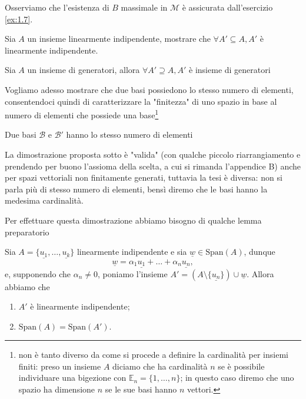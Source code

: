 \begin{remark}
    Osserviamo che l'esistenza di $B$ massimale in $\mathcal{M}$ è assicurata dall'esercizio \ref{ex:1.7}.
\end{remark}
\begin{exercise}
    \label{ex:1.5} Sia $A$ un insieme linearmente indipendente, mostrare che $\forall A' \subseteq A, A'$ è linearmente indipendente.
\end{exercise}
\begin{exercise}
    \label{ex:1.6} Sia $A$ un insieme di generatori, allora $\forall A' \supseteq A, A'$ è insieme di generatori
\end{exercise}
Vogliamo adesso mostrare che due basi possiedono lo stesso numero di elementi, consentendoci quindi di caratterizzare la "finitezza" di uno spazio in base al numero di elementi che possiede una base\footnote{non è tanto diverso da come si procede a definire la cardinalità per insiemi finiti: preso un insieme $A$ diciamo che ha cardinalità $n$ se è possibile individuare una bigezione con $\mathbb{E}_n = \{ 1, \ldots, n \}$; in questo caso diremo che uno spazio ha dimensione $n$ se le sue basi hanno $n$ vettori.}
\begin{theorem}
    \label{thm:dim} Due basi $\mathcal{B}$ e $\mathcal{B'}$ hanno lo stesso numero di elementi
\end{theorem}
\begin{remark}
    La dimostrazione proposta sotto è "valida" (con qualche piccolo riarrangiamento e prendendo per buono l'assioma della scelta, a cui si rimanda l'appendice B) anche per spazi vettoriali non finitamente generati, tuttavia la tesi è diversa: non si parla più di stesso numero di elementi, bensì diremo che le basi hanno la medesima cardinalità.
\end{remark}
Per effettuare questa dimostrazione abbiamo bisogno di qualche lemma preparatorio
\begin{lemma}
    Sia $A = \{ \underline{u_1}, \ldots, \underline{u_k} \}$ linearmente indipendente e sia $\underline{w} \in \text{Span}(A)$, dunque
    $$
        \underline{w} = \alpha_1 \underline{u_1} + \ldots + \alpha_n \underline{u_n},
    $$
    e, supponendo che $\alpha_n \neq 0$, poniamo l'insieme $A' = (A \setminus \{ \underline{u_n} \}) \cup \underline{w}$. Allora abbiamo che
    \begin{enumerate}[label=\protect\circled{\arabic*}]
        \item $A'$ è linearmente indipendente;
        \item $\text{Span}(A) = \text{Span}(A')$.
    \end{enumerate}
\end{lemma}
